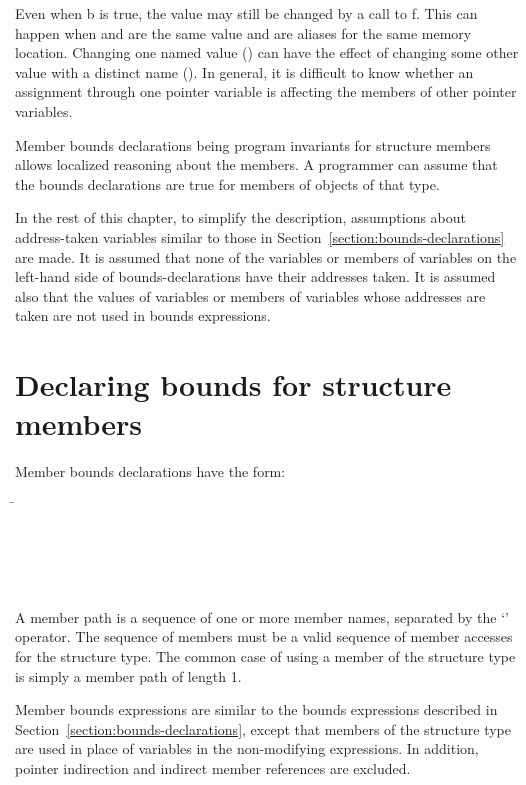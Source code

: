 Even when b is true, the value  may still be
changed by a call to f. This can happen when  and 
are the same value and are aliases for the same memory location.
Changing one named value () can have the
effect of changing some other value with a distinct name
(). In general, it is difficult to know
whether an assignment through one pointer variable is affecting the
members of other pointer variables.

Member bounds declarations being program invariants for structure members allows
localized reasoning about the members. A programmer can assume that the
bounds declarations are true for members of objects of that type.

In the rest of this chapter, to simplify the description, assumptions
about address-taken variables similar to those in
Section~\ref{section:bounds-declarations} are made.
It is assumed that none of the variables or members of variables on the
left-hand side of bounds-declarations have their addresses taken. It is
assumed also that the values of variables or members of variables whose
addresses are taken are not used in bounds expressions.

\section{Declaring bounds for structure members}

Member bounds declarations have the form:
\begin{tabbing}
\=\\
\>  \code{:}  \\
\\
\\
\>  \\
\>   
\end{tabbing}

A member path is a sequence of one or more member names, separated by
the `' operator. The sequence of members must be a valid sequence of
member accesses for the structure type. The common case of using a
member of the structure type is simply a member path of length 1.

Member bounds expressions are similar to the bounds expressions
described in Section~\ref{section:bounds-declarations}, 
except that members of the structure type are
used in place of variables in the non-modifying expressions. In
addition, pointer indirection and indirect member references are
excluded.

